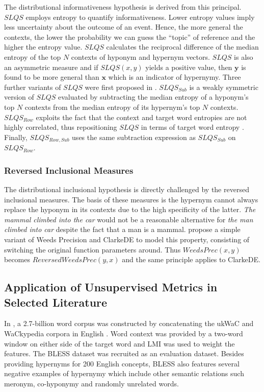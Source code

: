 The distributional informativeness hypothesis is derived from this principal.  $SLQS$ \citep{santus2014chasing} employs entropy to quantify informativeness.  Lower entropy values imply less uncertainty about the outcome of an event.  Hence, the more general the contexts, the lower the probability we can guess the “topic” of reference and the higher the entropy value.  $SLQS$ calculates the reciprocal difference of the median entropy of the top $N$ contexts of hyponym and hypernym vectors.  $SLQS$ is also an asymmetric measure and if $SLQS(x, y)$ yields a positive value, then $\textbf{y}$ is found to be more general than $\textbf{x}$ which is an indicator of hypernymy.  Three further variants of $SLQS$ were first proposed in \citep{shwartz2017siege}.  $SLQS_{Sub}$ is a weakly symmetric version of $SLQS$ evaluated by subtracting the median entropy of a hyponym's top $N$ contexts from the median entropy of its hypernym's top $N$ contexts.  $SLQS_{Row}$ exploits the fact that the context and target word entropies are not highly correlated, thus repositioning $SLQS$ in terms of target word entropy \citep{shwartz2017siege}.  Finally, $SLQS_{Row, Sub}$ uses the same subtraction expression as $SLQS_{Sub}$ on $SLQS_{Row}$.

\subsubsection{Reversed Inclusional Measures}
The distributional inclusional hypothesis is directly challenged by the reversed inclusional measures.  The basis of these measures is the hypernym cannot always replace the hyponym in its contexts due to the high specificity of the latter.  \textit{The mammal climbed into the car} would not be a reasonable alternative for \textit{the man climbed into car} despite the fact that a man is a mammal.  \citep{shwartz2017siege} propose a simple variant of Weeds Precision and ClarkeDE to model this property, consisting of switching the original function parameters around.  Thus $WeedsPrec(x,y)$ becomes $ReversedWeedsPrec(y, x)$ and the same principle applies to ClarkeDE.

\subsection{Application of Unsupervised Metrics in Selected Literature} \label{shwartz_unsupervised}
In \citep{santus2014chasing},  a 2.7-billion word corpus was constructed by concatenating the ukWaC \citep{ferraresi2007building} and WaCkypedia corpora in English \citep{baroni2009wacky}.  Word context was provided by a two-word window on either side of the target word and \ac{LMI} was used to weight the features.  The BLESS dataset \citep{Baroni2011} was recruited as an evaluation dataset.  Besides providing hypernyms for 200 English concepts, BLESS also features several negative examples of hypernymy which include other semantic relations such meronym, co-hyponymy and randomly unrelated words.

